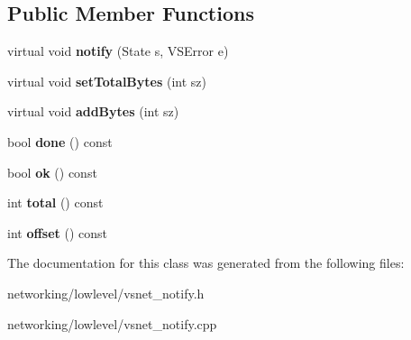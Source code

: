 \subsection*{Public Member Functions}
\begin{DoxyCompactItemize}
\item 
virtual void {\bfseries notify} (State s, V\+S\+Error e)\hypertarget{classVsnetDownload_1_1Client_1_1NotifyMe_ad2fc15c0a8c496dea399eda1e692f603}{}\label{classVsnetDownload_1_1Client_1_1NotifyMe_ad2fc15c0a8c496dea399eda1e692f603}

\item 
virtual void {\bfseries set\+Total\+Bytes} (int sz)\hypertarget{classVsnetDownload_1_1Client_1_1NotifyMe_a73b25f682c87b5fc9370cf7de2cac8a6}{}\label{classVsnetDownload_1_1Client_1_1NotifyMe_a73b25f682c87b5fc9370cf7de2cac8a6}

\item 
virtual void {\bfseries add\+Bytes} (int sz)\hypertarget{classVsnetDownload_1_1Client_1_1NotifyMe_a637664f0ef6ccf38de1efd452cc4426e}{}\label{classVsnetDownload_1_1Client_1_1NotifyMe_a637664f0ef6ccf38de1efd452cc4426e}

\item 
bool {\bfseries done} () const \hypertarget{classVsnetDownload_1_1Client_1_1NotifyMe_a57de5918f9db0454d18ed5972b2ca444}{}\label{classVsnetDownload_1_1Client_1_1NotifyMe_a57de5918f9db0454d18ed5972b2ca444}

\item 
bool {\bfseries ok} () const \hypertarget{classVsnetDownload_1_1Client_1_1NotifyMe_a472f57ff858761e8bdadd82a420411ca}{}\label{classVsnetDownload_1_1Client_1_1NotifyMe_a472f57ff858761e8bdadd82a420411ca}

\item 
int {\bfseries total} () const \hypertarget{classVsnetDownload_1_1Client_1_1NotifyMe_ac4319494689db5a196e6483ba26a148f}{}\label{classVsnetDownload_1_1Client_1_1NotifyMe_ac4319494689db5a196e6483ba26a148f}

\item 
int {\bfseries offset} () const \hypertarget{classVsnetDownload_1_1Client_1_1NotifyMe_a9303f3d63f8b8cff4b3b0bb1966fba54}{}\label{classVsnetDownload_1_1Client_1_1NotifyMe_a9303f3d63f8b8cff4b3b0bb1966fba54}

\end{DoxyCompactItemize}


The documentation for this class was generated from the following files\+:\begin{DoxyCompactItemize}
\item 
networking/lowlevel/vsnet\+\_\+notify.\+h\item 
networking/lowlevel/vsnet\+\_\+notify.\+cpp\end{DoxyCompactItemize}
